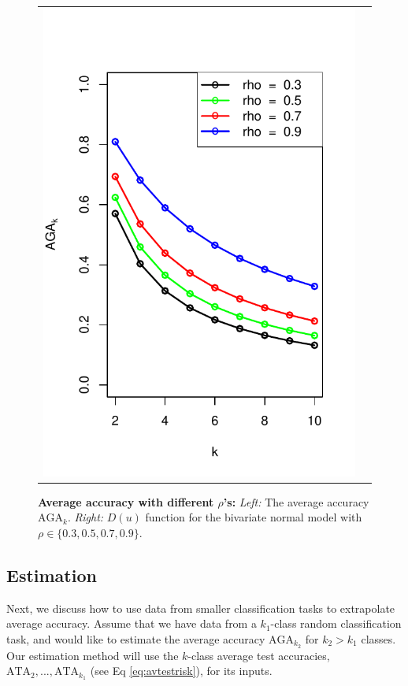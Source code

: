 \documentclass[twoside,11pt]{article}
\begin{document}
\begin{figure}[h]
\begin{tabular}{cc}
\includegraphics[scale = 0.6, clip = true, trim = 0.0in 0 0.2in 0.6in]{illus_rhos_avrisk.pdf}
\end{tabular}

\caption{\textbf{Average accuracy with different $\rho$'s:}
\emph{Left:} The average accuracy $\text{AGA}_k$. \emph{Right:} ${D}(u)$ function for the bivariate normal model with $\rho \in \{0.3, 0.5, 0.7, 0.9\}$.
}\label{fig:toy4}
\end{figure}
\subsection{Estimation}\label{sec:extrapolation_estimation}

Next, we discuss how to use data from smaller classification tasks to
extrapolate average accuracy.  Assume that we have data from a
$k_1$-class random classification task, and would like to estimate the
average accuracy $\text{AGA}_{k_2}$ for $k_2>k_1$ classes.  
Our estimation method will use the $k$-class average test accuracies,
$\text{ATA}_2,...,\text{ATA}_{k_1}$ (see Eq \ref{eq:avtestrisk}), for
its inputs.
\end{document}
